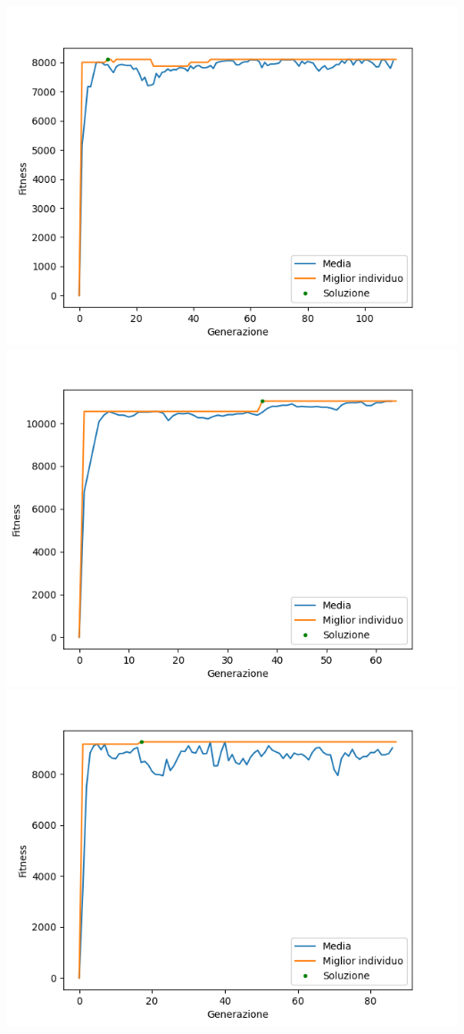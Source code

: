 \documentclass{CSUniSchoolLabReport}
\begin{document}
\begin{center}
	\includegraphics[scale=0.25]{results/0}
	\includegraphics[scale=0.25]{results/1}
	\includegraphics[scale=0.25]{results/2}

\end{center}
\end{document}
